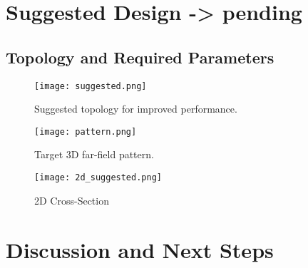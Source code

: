 \documentclass[11pt]{article}
\begin{document}
\section{Suggested Design -> pending}
\subsection{Topology and Required Parameters}
\begin{figure}[H]
  \centering
  \texttt{[image: suggested.png]}
  \caption{Suggested topology for improved performance.}
  \label{fig:suggested_topo}
\end{figure}
\begin{figure}[H]
  \centering
  \texttt{[image: pattern.png]}
  \caption{Target 3D far-field pattern.}
  \label{fig:target_pattern}
\end{figure}
\begin{figure}[h!]
    \centering
    \texttt{[image: 2d\_suggested.png]}
    \caption{2D Cross-Section}
    \label{fig:placeholder}
\end{figure}

\section{Discussion and Next Steps}
\end{document}
